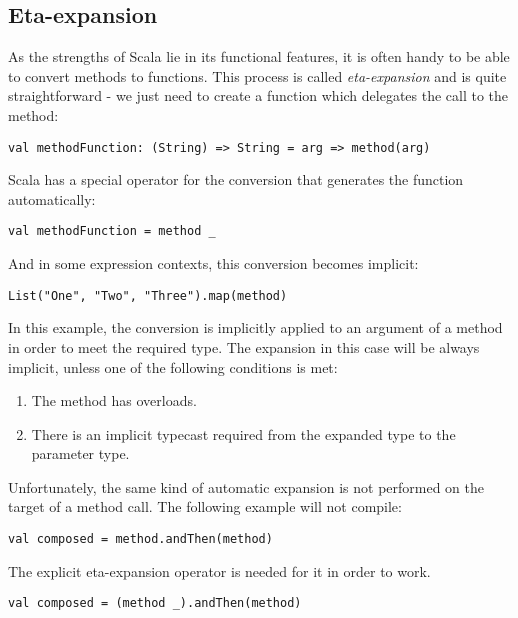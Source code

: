 \subsection{Eta-expansion}
\label{subsec:etaexpansion}

As the strengths of Scala lie in its functional features, it is often handy to be able to convert methods to functions. This process is called \textit{eta-expansion} and is quite straightforward - we just need to create a function which delegates the call to the method:

\lstset{style=Scala}
\begin{lstlisting}
val methodFunction: (String) => String = arg => method(arg)
\end{lstlisting}

Scala has a special operator for the conversion that generates the function automatically:

\lstset{style=Scala}
\begin{lstlisting}
val methodFunction = method _
\end{lstlisting}

And in some expression contexts, this conversion becomes implicit:

\lstset{style=Scala}
\begin{lstlisting}
List("One", "Two", "Three").map(method)
\end{lstlisting}

In this example, the conversion is implicitly applied to an argument of a method in order to meet the required type. The expansion in this case will be always implicit, unless one of the following conditions is met:
\begin{enumerate}
	\item The method has overloads.
	\item There is an implicit typecast required from the expanded type to the parameter type.
\end{enumerate}

Unfortunately, the same kind of automatic expansion is not performed on the target of a method call. The following example will not compile:

\lstset{style=Scala}
\begin{lstlisting}
val composed = method.andThen(method)
\end{lstlisting}

The explicit eta-expansion operator is needed for it in order to work.

\lstset{style=Scala}
\begin{lstlisting}
val composed = (method _).andThen(method)
\end{lstlisting}

